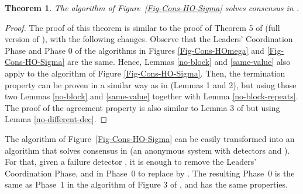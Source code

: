 \documentclass[10pt, conference, compsocconf]{IEEEtran}
\newtheorem{theorem}{Theorem}
\begin{document}
 \begin{theorem}
 \label{thm:consensus2}
The  algorithm   of  Figure~\ref{Fig-Cons-HO-Sigma}  solves   consensus  in
 . 
\end{theorem}
\begin{proof}
The  proof  of this  theorem  is  similar to  the  proof  of  Theorem 5  of
 \cite{TR-DBLP:conf/wdag/BonnetR10}         (full         version        of
 \cite{DBLP:conf/wdag/BonnetR10}), with the following changes. Observe that
 the Leaders' Coordination Phase and  
 Phase   0  of   the  algorithms   in  Figures   \ref{Fig-Cons-HOmega}  and
 \ref{Fig-Cons-HO-Sigma}  are the  same. Hence,  Lemmas  \ref{no-block} and
 \ref{same-value}    also    apply    to    the   algorithm    of    Figure
 \ref{Fig-Cons-HO-Sigma}.  Then,  
 the  termination  property   can  be  proven  in  a   similar  way  as  in
 \cite{TR-DBLP:conf/wdag/BonnetR10} (Lemmas  1 and 2), but  using those two
 Lemmas   \ref{no-block}   and   \ref{same-value}   together   with   Lemma
 \ref{no-block-repeats}.  The  proof  of  the agreement  property  is  also
 similar to  Lemma 3 of \cite{TR-DBLP:conf/wdag/BonnetR10}  but using Lemma
 \ref{no-different-dec}. 
\end{proof}



The algorithm of Figure~\ref{Fig-Cons-HO-Sigma} can be easily transformed into an algorithm that solves consensus in 
 (an anonymous system with detectors  and ).
For that, given a failure detector , it is enough to remove the Leaders' Coordination Phase, 
and in Phase~0 to replace  by . The resulting Phase~0 is the same as Phase~1 in the algorithm of Figure 3 of \cite{DBLP:conf/wdag/BonnetR10}, and has the same properties.
\end{document}
